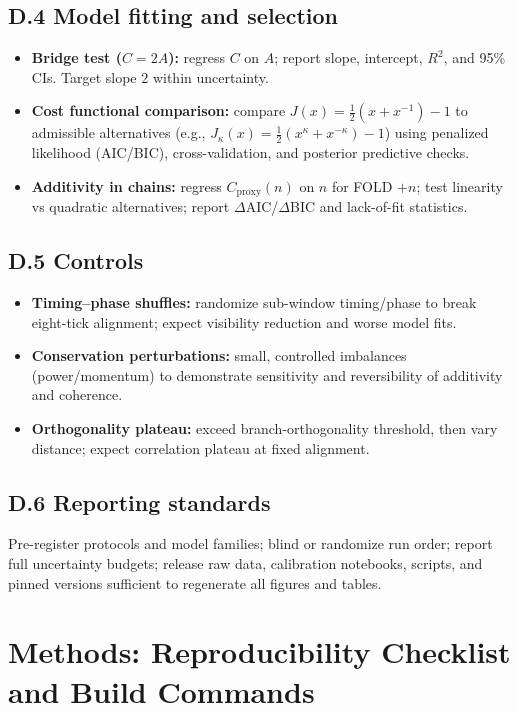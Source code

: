 \documentclass[12pt,a4paper]{article}
\begin{document}
\subsection*{D.4 Model fitting and selection}
\begin{itemize}
  \item \textbf{Bridge test ($C=2A$):} regress $C$ on $A$; report slope, intercept, $R^{2}$, and 95\% CIs. Target slope $2$ within uncertainty.
  \item \textbf{Cost functional comparison:} compare $J(x)=\tfrac{1}{2}(x+x^{-1})-1$ to admissible alternatives (e.g., $J_{\kappa}(x)=\tfrac{1}{2}(x^{\kappa}+x^{-\kappa})-1$) using penalized likelihood (AIC/BIC), cross-validation, and posterior predictive checks.
  \item \textbf{Additivity in chains:} regress $C_{\mathrm{proxy}}(n)$ on $n$ for FOLD $+n$; test linearity vs quadratic alternatives; report $\Delta$AIC/$\Delta$BIC and lack-of-fit statistics.
\end{itemize}

\subsection*{D.5 Controls}
\begin{itemize}
  \item \textbf{Timing–phase shuffles:} randomize sub-window timing/phase to break eight-tick alignment; expect visibility reduction and worse model fits.
  \item \textbf{Conservation perturbations:} small, controlled imbalances (power/momentum) to demonstrate sensitivity and reversibility of additivity and coherence.
  \item \textbf{Orthogonality plateau:} exceed branch-orthogonality threshold, then vary distance; expect correlation plateau at fixed alignment.
\end{itemize}

\subsection*{D.6 Reporting standards}
Pre-register protocols and model families; blind or randomize run order; report full uncertainty budgets; release raw data, calibration notebooks, scripts, and pinned versions sufficient to regenerate all figures and tables.

\section{Methods: Reproducibility Checklist and Build Commands}\label{app:repro}
\end{document}
